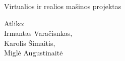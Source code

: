 \documentclass[a4paper,12pt]{article}
\begin{document}
\begin{titlepage}
	\begin{center}
		\Huge Virtualios ir realios mašinos projektas\\
		[4cm]
		\end{center}
		\begin{flushright}
		Atliko:\\
		Irmantas Varačisnkas,\\
		Karolis Šimaitis,\\
		Miglė Augustinaitė\\
		\end{flushright}
\end{titlepage}	
\tableofcontents
\newpage






\end{document}
